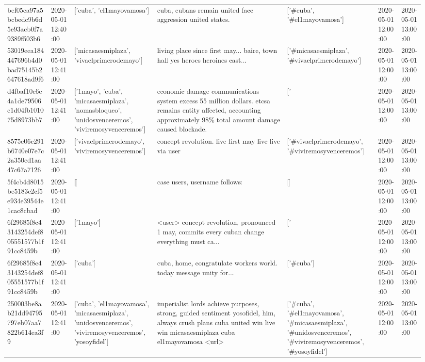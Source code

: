 \begin{tabular}{lllllll}
bef05ca97a5bcbedc9b6d5e93acb0f7a9389f503b6 & 2020-05-01 12:40:00 & ['cuba', 'el1mayovamosa'] & cuba, cubans remain united face aggression united states. & ['#cuba', '#el1mayovamosa'] & 2020-05-01 12:00:00 & 2020-05-01 13:00:00 \\
53019eea184447696b4d0bad75145b2647618ad9f6 & 2020-05-01 12:41:00 & ['micasaesmiplaza', 'vivaelprimerodemayo'] & living place since first may... baire, town hall yes heroes heroines east... & ['#micasaesmiplaza', '#vivaelprimerodemayo'] & 2020-05-01 12:00:00 & 2020-05-01 13:00:00 \\
d4fbaf10c6c4a1de79506c1d04fb101075d8973bb7 & 2020-05-01 12:41:00 & ['1mayo', 'cuba', 'micasaesmiplaza', 'nomasbloqueo', 'unidosvenceremos', 'viviremosyvenceremos'] & economic damage communications system excess 55 million dollars. etcsa remains entity affected, accounting approximately 98\% total amount damage caused blockade. & ['#1mayo', '#cuba', '#micasaesmiplaza', '#nomasbloqueo', '#unidosvenceremos', '#viviremosyvenceremos'] & 2020-05-01 12:00:00 & 2020-05-01 13:00:00 \\
8575e06c291b6740e07e7c2a350ed1aa47c67a7126 & 2020-05-01 12:41:00 & ['vivaelprimerodemayo', 'viviremosyvenceremos'] & concept revolution. live first may live live via user & ['#vivaelprimerodemayo', '#viviremosyvenceremos'] & 2020-05-01 12:00:00 & 2020-05-01 13:00:00 \\
5f4cb4d8015be5183e2cf5e934e39544e1cac8cbad & 2020-05-01 12:41:00 & [] & case users, username follows: & [] & 2020-05-01 12:00:00 & 2020-05-01 13:00:00 \\
6f29685f8c43143254def805551577b1f91cc8459b & 2020-05-01 12:41:00 & ['1mayo'] & <user> concept revolution, pronounced 1 may, commits every cuban change everything must ca... & ['#1mayo'] & 2020-05-01 12:00:00 & 2020-05-01 13:00:00 \\
6f29685f8c43143254def805551577b1f91cc8459b & 2020-05-01 12:41:00 & ['cuba'] & cuba, home, congratulate workers world. today message unity for... & ['#cuba'] & 2020-05-01 12:00:00 & 2020-05-01 13:00:00 \\
250003be8ab21dd94795797eb07aa7822b614ea3f9 & 2020-05-01 12:41:00 & ['cuba', 'el1mayovamosa', 'micasaesmiplaza', 'unidosvenceremos', 'viviremosyvenceremos', 'yosoyfidel'] & imperialist lords achieve purposes, strong, guided sentiment yosofidel, him, always crush plans cuba united win live win micasaesmiplaza cuba el1mayovamosa <url> & ['#cuba', '#el1mayovamosa', '#micasaesmiplaza', '#unidosvenceremos', '#viviremosyvenceremos', '#yosoyfidel'] & 2020-05-01 12:00:00 & 2020-05-01 13:00:00 \\

\end{tabular}
